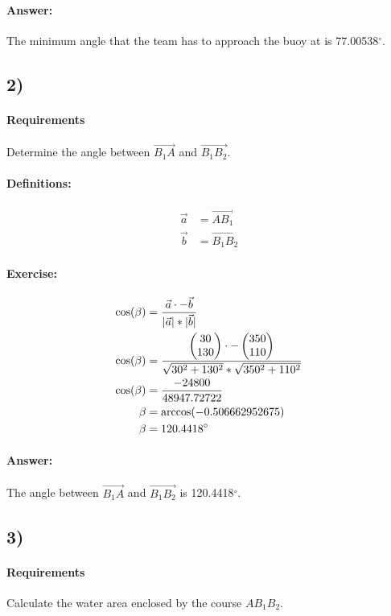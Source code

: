 \paragraph{Answer:}
The minimum angle that the team has to approach the buoy at is  77.00538$^\circ$.

\subsection{2)}
\paragraph{Requirements}
Determine the angle between $\vec{B_1A}$ and $\vec{B_1B_2}$.

\paragraph{Definitions:}
\begin{align}
    \vec{a} &= \vec{AB_1} \\
    \vec{b} &= \vec{B_1B_2}
\end{align}

\paragraph{Exercise:}
\begin{align}
    \cos(\beta) &= \frac{\vec{a} \cdot -\vec{b}}{|\vec{a}| * |\vec{b}|} \\
    \cos(\beta) &= \frac{\begin{pmatrix} 30 \\ 130 \end{pmatrix} \cdot -\begin{pmatrix} 350 \\ 110 \end{pmatrix}}{\sqrt{30^2 + 130^2} * \sqrt{350^2 + 110^2}} \\
    \cos(\beta) &= \frac{-24800}{48947.72722} \\
    \beta &= \arccos(-0.506662952675) \\
    \beta &= 120.4418^\circ
\end{align}

\paragraph{Answer:}
The angle between $\vec{B_1A}$ and $\vec{B_1B_2}$ is 120.4418$^\circ$.

\subsection{3)}
\paragraph{Requirements}
Calculate the water area enclosed by the course $AB_1B_2$.

